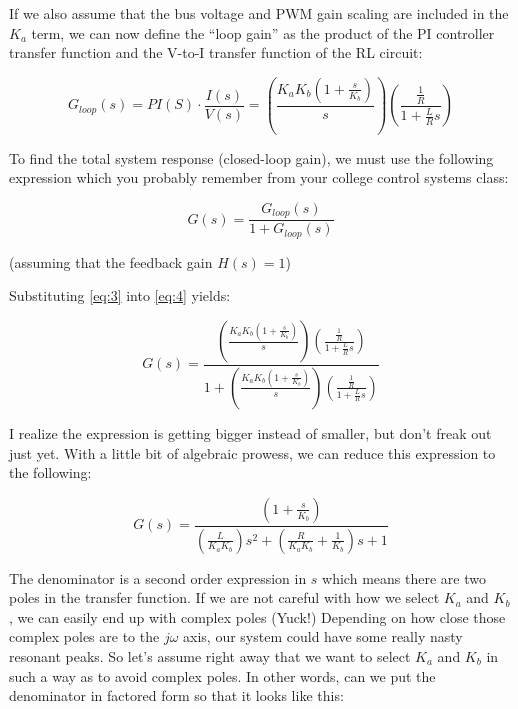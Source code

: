 If we also assume that the bus voltage and PWM gain scaling are included in the $K_a$ term, we can now define the “loop gain” as the product of the PI controller transfer function and the V-to-I transfer function of the RL circuit:

\begin{equation}\label{eq:3}
    G_{loop}(s) = PI(S)\cdot\frac{I(s)}{V(s)} = \left(\frac{K_aK_b \left(1+\frac{s}{K_b}\right)}{s}\right)\left(\frac{\frac1R}{1+\frac{L}{R}s}\right)
\end{equation}

To find the total system response (closed-loop gain), we must use the following expression which you probably remember from your college control systems class:

\begin{equation}\label{eq:4}
    G(s) = \frac{G_{loop}(s)}{1+G_{loop}(s)}
\end{equation}

(assuming that the feedback gain $H(s) = 1$)

Substituting \ref{eq:3} into \ref{eq:4} yields:

\begin{equation}
    G(s) = \frac{\left(\frac{K_aK_b \left(1+\frac{s}{K_b}\right)}{s}\right)\left(\frac{\frac1R}{1+\frac{L}{R}s}\right)}{1+\left(\frac{K_aK_b \left(1+\frac{s}{K_b}\right)}{s}\right)\left(\frac{\frac1R}{1+\frac{L}{R}s}\right)}
\end{equation}

I realize the expression is getting bigger instead of smaller, but don’t freak out just yet.  With a little bit of algebraic prowess, we can reduce this expression to the following:

\begin{equation}\label{eq:6}
    G(s) = \frac{\left(1+\frac{s}{K_b}\right)}{\left(\frac{L}{K_aK_b}\right)s^2 + \left(\frac{R}{K_aK_b}+\frac{1}{K_b}\right)s + 1}
\end{equation}

The denominator is a second order expression in $s$ which means there are two poles in the transfer function.  If we are not careful with how we select $K_a$ and $K_b$, we can easily end up with complex poles (Yuck!)  Depending on how close those complex poles are to the $j\omega$ axis, our system could have some really nasty resonant peaks.  So let’s assume right away that we want to select $K_a$ and $K_b$ in such a way as to avoid complex poles.  In other words, can we put the denominator in factored form so that it looks like this:

